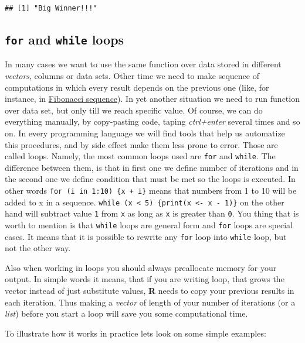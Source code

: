 \documentclass[]{book}
\theoremstyle{definition}
\theoremstyle{definition}
\theoremstyle{definition}
\theoremstyle{remark}
\begin{document}
\begin{verbatim}
## [1] "Big Winner!!!"
\end{verbatim}

\subsection{\texorpdfstring{\texttt{for} and \texttt{while}
loops}{for and while loops}}\label{for-and-while-loops}

In many cases we want to use the same function over data stored in
different \emph{vectors}, columns or data sets. Other time we need to
make sequence of computations in which every result depends on the
previous one (like, for instance, in
\href{https://en.wikipedia.org/wiki/Fibonacci_number}{Fibonacci
sequence}). In yet another situation we need to run function over data
set, but only till we reach specific value. Of course, we can do
everything manually, by copy-pasting code, taping \emph{ctrl+enter}
several times and so on. In every programming language we will find
tools that help us automatize this procedures, and by side effect make
them less prone to error. Those are called loops. Namely, the most
common loops used are \texttt{for} and \texttt{while}. The difference
between them, is that in first one we define number of iterations and in
the second one we define condition that must be met so the loops is
executed. In other words \texttt{for\ (i\ in\ 1:10)\ \{x\ +\ i\}} means
that numbers from 1 to 10 will be added to x in a sequence.
\texttt{while\ (x\ \textless{}\ 5)\ \{print(x\ \textless{}-\ x\ -\ 1)\}}
on the other hand will subtract value \texttt{1} from \texttt{x} as long
as \texttt{x} is greater than \texttt{0}. You thing that is worth to
mention is that \texttt{while} loops are general form and \texttt{for}
loops are special cases. It means that it is possible to rewrite any
\texttt{for} loop into \texttt{while} loop, but not the other way.

Also when working in loops you should always preallocate memory for your
output. In simple words it means, that if you are writing loop, that
grows the vector instead of just substitute values, \textbf{R} needs to
copy your previous results in each iteration. Thus making a
\emph{vector} of length of your number of iterations (or a \emph{list})
before you start a loop will save you some computational time.

To illustrate how it works in practice lets look on some simple
examples:
\end{document}
